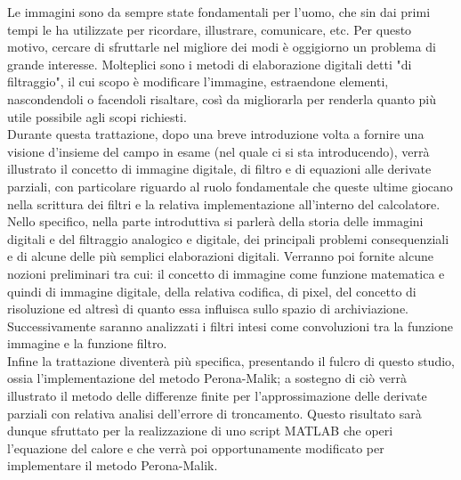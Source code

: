 Le immagini sono da sempre state fondamentali per l'uomo, che sin dai primi tempi le ha utilizzate per ricordare, illustrare, comunicare, etc. Per questo motivo, cercare di sfruttarle nel migliore dei modi è oggigiorno un problema di grande interesse. Molteplici sono i metodi di elaborazione digitali detti "di filtraggio", il cui scopo è modificare l'immagine, estraendone elementi, nascondendoli o facendoli risaltare, così da migliorarla per renderla quanto più utile possibile agli scopi richiesti.\\
Durante questa trattazione, dopo una breve introduzione volta a fornire una visione d'insieme del campo in esame (nel quale ci si sta introducendo), verrà illustrato il concetto di immagine digitale, di filtro e di equazioni alle derivate parziali, con particolare riguardo al ruolo fondamentale che queste ultime giocano nella scrittura dei filtri e la relativa implementazione all'interno del calcolatore.\\
Nello specifico, nella parte introduttiva si parlerà della storia delle immagini digitali e del filtraggio analogico e digitale, dei principali problemi consequenziali e di alcune delle più semplici elaborazioni digitali. Verranno poi fornite alcune nozioni preliminari tra cui: il concetto di immagine come funzione matematica e quindi di immagine digitale, della relativa codifica, di pixel, del concetto di risoluzione ed altresì di quanto essa influisca sullo spazio di archiviazione. Successivamente saranno analizzati i filtri intesi come convoluzioni tra la funzione immagine e la funzione filtro.\\
Infine la trattazione diventerà più specifica, presentando il fulcro di questo studio, ossia l'implementazione del metodo Perona-Malik; a sostegno di ciò verrà illustrato il metodo delle differenze finite per l'approssimazione delle derivate parziali con relativa analisi dell'errore di troncamento. Questo risultato sarà dunque sfruttato per la realizzazione di uno script MATLAB che operi l'equazione del calore e che verrà poi opportunamente modificato per implementare il metodo Perona-Malik.   